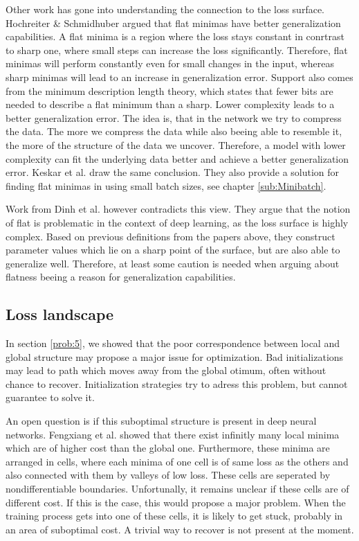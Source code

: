 Other work has gone into understanding the connection to the loss surface.
Hochreiter \& Schmidhuber \cite{hochreiter1997flat} argued that flat minimas
have better generalization capabilities. A flat minima is a region where the
loss stays constant in conrtrast to sharp one, where small steps can increase
the loss significantly. Therefore, flat minimas will perform constantly even for
small changes in the input, whereas sharp minimas will lead to an increase in
generalization error. Support also comes from the minimum description length
theory, which states that fewer bits are needed to describe a flat minimum than
a sharp. Lower complexity leads to a better generalization error. The idea is,
that in the network we try to compress the data. The more we compress the data
while also beeing able to resemble it, the more of the structure of the data we
uncover. Therefore, a model with lower complexity can fit the underlying data
better and achieve a better generalization error. Keskar et al.
\cite{keskar2016large} draw the same conclusion. They also provide a solution
for finding flat minimas in using small batch sizes, see chapter
\ref{sub:Minibatch}.

Work from Dinh et al. \cite{dinh2017sharp} however contradicts this view. They
argue that the notion of flat is problematic in the context of deep learning, as
the loss surface is highly complex. Based on previous definitions from the
papers above, they construct parameter values which lie on a sharp point of the
surface, but are also able to generalize well. Therefore, at least some caution
is needed when arguing about flatness beeing a reason for generalization
capabilities.

\subsection{Loss landscape}\label{loss_landscape}
In section \ref{prob:5}, we showed that the poor correspondence between local
and global structure may propose a major issue for optimization. Bad
initializations may lead to path which moves away from the global otimum, often
without chance to recover. Initialization strategies try to adress this problem,
but cannot guarantee to solve it.

An open question is if this suboptimal structure is present in deep neural
networks. Fengxiang et al. \cite{he2020piecewise} showed that there exist
infinitly many local minima which are of higher cost than the global one.
Furthermore, these minima are arranged in cells, where each minima of one cell
is of same loss as the others and also connected with them by valleys of low
loss. These cells are seperated by nondifferentiable boundaries. Unfortunally,
it remains unclear if these cells are of different cost. If this is the case,
this would propose a major problem. When the training process gets into one of
these cells, it is likely to get stuck, probably in an area of suboptimal cost.
A trivial way to recover is not present at the moment.

